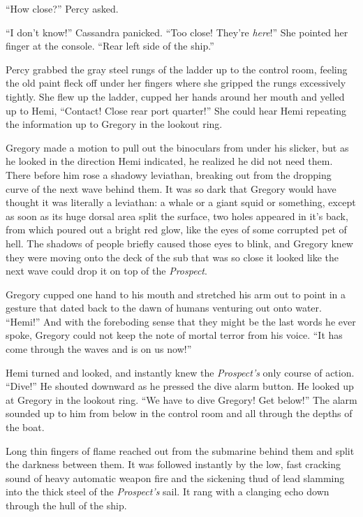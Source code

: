\documentclass[]{scrbook}
\begin{document}
``How close?'' Percy asked.

``I don't know!'' Cassandra panicked. ``Too close! They're
\emph{here}!'' She pointed her finger at the console. ``Rear left side
of the ship.''

Percy grabbed the gray steel rungs of the ladder up to the control room,
feeling the old paint fleck off under her fingers where she gripped the
rungs excessively tightly. She flew up the ladder, cupped her hands
around her mouth and yelled up to Hemi, ``Contact! Close rear port
quarter!'' She could hear Hemi repeating the information up to Gregory
in the lookout ring.

Gregory made a motion to pull out the binoculars from under his slicker,
but as he looked in the direction Hemi indicated, he realized he did not
need them. There before him rose a shadowy leviathan, breaking out from
the dropping curve of the next wave behind them. It was so dark that
Gregory would have thought it was literally a leviathan: a whale or a
giant squid or something, except as soon as its huge dorsal area split
the surface, two holes appeared in it's back, from which poured out a
bright red glow, like the eyes of some corrupted pet of hell. The
shadows of people briefly caused those eyes to blink, and Gregory knew
they were moving onto the deck of the sub that was so close it looked
like the next wave could drop it on top of the \emph{Prospect}.

Gregory cupped one hand to his mouth and stretched his arm out to point
in a gesture that dated back to the dawn of humans venturing out onto
water. ``Hemi!'' And with the foreboding sense that they might be the
last words he ever spoke, Gregory could not keep the note of mortal
terror from his voice. ``It has come through the waves and is on us
now!''

Hemi turned and looked, and instantly knew the \emph{Prospect's} only
course of action. ``Dive!'' He shouted downward as he pressed the dive
alarm button. He looked up at Gregory in the lookout ring. ``We have to
dive Gregory! Get below!'' The alarm sounded up to him from below in the
control room and all through the depths of the boat.

Long thin fingers of flame reached out from the submarine behind them
and split the darkness between them. It was followed instantly by the
low, fast cracking sound of heavy automatic weapon fire and the
sickening thud of lead slamming into the thick steel of the
\emph{Prospect's} sail. It rang with a clanging echo down through the
hull of the ship.
\end{document}
